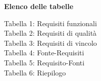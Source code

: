 \documentclass[5pt]{article}
\begin{document}
\pagebreak

\begin{flushleft}
\textbf{\Large Elenco delle tabelle}
\begin{spacing}{1.5}

	Tabella 1: Requisiti funzionali \\
	Tabella 2: Requisiti di qualità \\
	Tabella 3: Requisiti di vincolo \\
	Tabella 4: Fonte-Requisiti \\
	Tabella 5: Requisito-Fonti \\
	Tabella 6: Riepilogo
\end{spacing}
\end{flushleft}

\pagebreak








\end{document}
